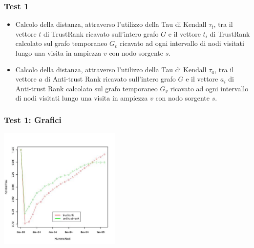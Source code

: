 \documentclass{beamer}
\begin{document}
\begin{frame}
\frametitle{Test 1}
\begin{itemize}
 \item<1-> Calcolo della distanza, attraverso l’utilizzo della Tau di Kendall \(\tau_t\), tra il vettore \(t\) di TrustRank ricavato sull’intero grafo \(G\) e il vettore \(t_i\) di TrustRank calcolato sul grafo temporaneo \(G_v\) ricavato ad ogni intervallo di nodi visitati lungo una visita in ampiezza \(v\) con nodo sorgente \(s\).
 \item<2-> Calcolo della distanza, attraverso l’utilizzo della Tau di Kendall \(\tau_a\), tra il vettore \(a\) di Anti-trust Rank ricavato sull’intero grafo \(G\) e il vettore \(a_i\) di Anti-trust Rank calcolato sul grafo temporaneo \(G_v\) ricavato ad ogni intervallo di nodi visitati lungo una visita in ampiezza \(v\) con nodo sorgente \(s\).
\end{itemize}
\end{frame}
\begin{frame}
\frametitle{Test 1: Grafici}
\begin{center}
 \includegraphics[height=6cm]{immagini/test1/coplotTrustAnti_62}
\end{center}
\end{frame}
\end{document}
